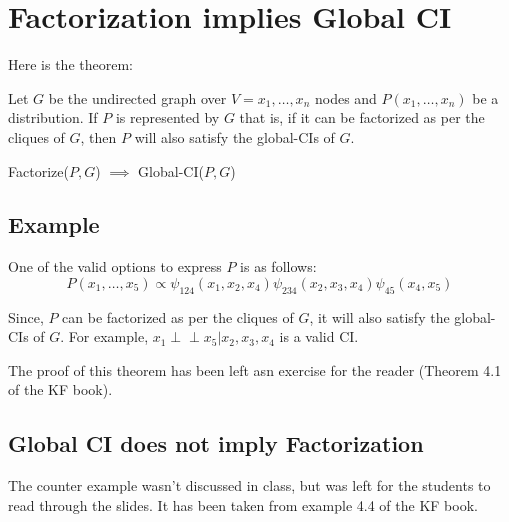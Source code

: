 \documentclass[a4paper,12pt]{article}
\begin{document}
\section{Factorization implies Global CI}
Here is the theorem:

Let $G$ be the undirected graph over $V = x_1, \dots, x_n$ nodes and $P(x_1, \dots, x_n)$ be a distribution. If $P$ is represented by $G$ that is, if it can be factorized as per the cliques of $G$, then $P$ will also satisfy the global-CIs of $G$.

Factorize($P, G$) $\implies$ Global-CI($P, G$)

\subsection{Example}

\begin{minipage}{0.55\textwidth} 
    One of the valid options to express $P$ is as follows:
    \[P(x_1, \dots, x_5) \propto \psi_{124}(x_1, x_2, x_4)\psi_{234}(x_2, x_3, x_4)\psi_{45}(x_4, x_5)\]

    Since, $P$ can be factorized as per the cliques of $G$, it will also satisfy the global-CIs of $G$. For example, $x_1 \perp\!\!\!\perp x_5 | x_2, x_3, x_4$ is a valid CI.
\end{minipage}
\hfill 
\begin{minipage}{0.40\textwidth} 
\end{minipage}

The proof of this theorem has been left asn exercise for the reader (Theorem 4.1 of the KF book).

\subsection{Global CI does not imply Factorization}
The counter example wasn't discussed in class, but was left for the students to read through the slides. It has been taken from example 4.4 of the KF book.
\end{document}
